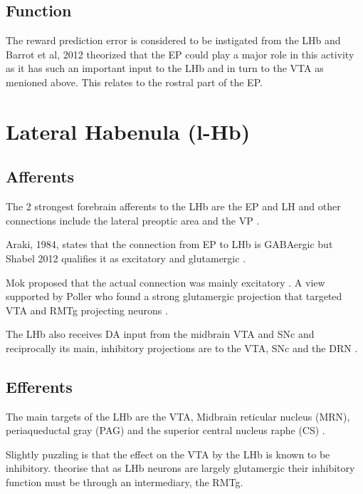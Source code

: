 \documentclass[12pt,a4paper]{article}
\begin{document}
\subsection{Function}

The reward prediction error is considered to be instigated from the
LHb and Barrot et al, 2012 theorized that the EP could play a major
role in this activity as it has such an important input to the LHb
\citep{Barrot2012} and in turn to the VTA as menioned above. This
relates to the rostral part of the EP.







\section{Lateral Habenula (l-Hb)}

\subsection{Afferents}
The 2 strongest forebrain afferents to the LHb are the EP and LH and
other connections include the lateral preoptic area and the VP
\citep{Parent1981}.

Araki, 1984, states that the connection from EP to LHb is GABAergic
\citep{Araki1984} but Shabel 2012 qualifies it as excitatory and
glutamergic \citep{Shabel2012}.

Mok proposed that the actual connection was mainly excitatory
\citep{Mok1974}. A view supported by Poller who found a strong
glutamergic projection that targeted VTA and RMTg projecting neurons
\citep{Poller2013}.

The LHb also receives DA input from the midbrain VTA and SNc
\citep{Kowski2009} and reciprocally its main, inhibitory projections
are to the VTA, SNc and the DRN
\citep{Ji2007, Christoph1986, Rajakumar1993}.

\subsection{Efferents}
The main targets of the LHb are the VTA, Midbrain reticular nucleus
(MRN), periaqueductal gray (PAG) and the superior central nucleus
raphe (CS) \citep{Quina2015}.

Slightly puzzling is that the effect on the VTA by the LHb is known to
be inhibitory. \citet{Hong2011} theorise that as LHb neurons are
largely glutamergic their inhibitory function must be through an
intermediary, the RMTg.
\end{document}
